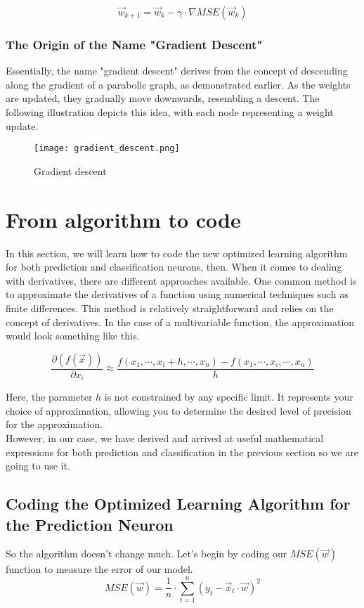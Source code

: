 \[
\vec{w}_{k + 1} = \vec{w}_{k} - \gamma \cdot \nabla MSE(\vec{w}_k)
\]

\subsubsection{The Origin of the Name "Gradient Descent"}
Essentially, the name "gradient descent" derives from the concept of descending along the gradient of a
parabolic graph, as demonstrated earlier. As the weights are updated, they gradually move downwards,
resembling a descent. The following illustration depicts this idea, with each node representing a weight update.
\begin{figure}[H]
  \centering
  \texttt{[image: gradient\_descent.png]}
  \caption{Gradient descent}
\end{figure}

\section{From algorithm to code}
In this section, we will learn how to code the new optimized learning algorithm for both prediction
and classification neurons, then. When it comes to dealing with derivatives, there are different approaches
available.
One common method is to approximate the derivatives of a function using numerical techniques such as
finite differences. This method is relatively straightforward and relies on the concept of derivatives.
In the case of a multivariable function, the approximation would look something like this.


\[
\frac{\partial (f(\vec{x}))}{\partial x_i} \approx \frac{f(x_1, \cdots, x_i + h, \cdots, x_n) -
  f(x_1, \cdots, x_i, \cdots, x_n)}{h}
\]

Here, the parameter $h$ is not constrained by any specific limit. It represents your choice of
approximation, allowing you to determine the desired level of precision for the approximation.\\

However, in our case, we have derived and arrived at useful mathematical expressions
for both prediction and classification in the previous section so we are going to use it.

\subsection{Coding the Optimized Learning Algorithm for the Prediction Neuron}
So the algorithm doesn't change much. Let's begin by coding our $MSE(\vec{w})$ function to measure
the error of our model.
\[
MSE(\vec{w}) = \frac{1}{n} \cdot \sum_{t = 1}^n (y_t - \vec{x}_t \cdot \vec{w})^2
\]

